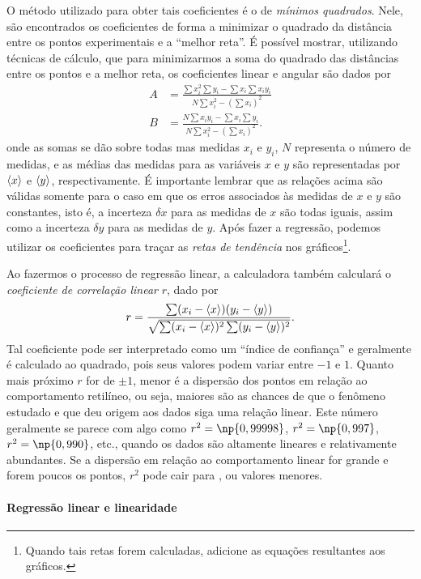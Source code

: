 O método utilizado para obter tais coeficientes é o de \emph{mínimos quadrados}. Nele, são encontrados os coeficientes de forma a minimizar o quadrado da distância entre os pontos experimentais e a ``melhor reta''. É possível mostrar\cite{Taylor}, utilizando técnicas de cálculo, que para minimizarmos a soma do quadrado das distâncias entre os pontos e a melhor reta, os coeficientes linear e angular são dados por
\begin{align}
	A &= \frac{\sum x_i^2 \sum y_i - \sum x_i \sum x_iy_i}{N \sum x_i^2 - (\sum x_i)^2} \\
	B &= \frac{N\sum x_iy_i - \sum x_i \sum y_i}{N \sum x_i^2 - (\sum x_i)^2}.
\end{align}
%
onde as somas se dão sobre todas mas medidas $x_i$ e $y_i$, $N$ representa o número de medidas, e as médias das medidas para as variáveis $x$ e $y$ são representadas por $\left\langle{x}\right\rangle$ e $\left\langle{y}\right\rangle$, respectivamente. É importante lembrar que as relações acima são válidas somente para o caso em que os erros associados às medidas de $x$ e $y$ são constantes, isto é, a incerteza $\delta x$ para as medidas de $x$ são todas iguais, assim como a incerteza $\delta y$ para as medidas de $y$. Após fazer a regressão, podemos utilizar os coeficientes para traçar as \emph{retas de tendência} nos gráficos\footnote{Quando tais retas forem calculadas, adicione as equações resultantes aos gráficos.}.

Ao fazermos o processo de regressão linear, a calculadora também calculará o \emph{coeficiente de correlação linear} $r$, dado por
\begin{equation}
	r = \frac{\sum (x_i - \left\langle{x}\right\rangle)(y_i-\left\langle{y}\right\rangle)}{\sqrt{\sum(x_i - \left\langle{x}\right\rangle)^2\sum (y_i - \left\langle{y}\right\rangle)^2}}.
\end{equation}
%
Tal coeficiente pode ser interpretado como um ``índice de confiança'' e geralmente é calculado ao quadrado, pois seus valores podem variar entre $-1$ e $1$. Quanto mais próximo $r$ for de $\pm 1$, menor é a dispersão dos pontos em relação ao comportamento retilíneo, ou seja, maiores são as chances de que o fenômeno estudado e que deu origem aos dados siga uma relação linear. Este número geralmente se parece com algo como $r^2=\np{0,99998}$, $r^2=\np{0,997}$, $r^2= \np{0,990}$, etc., quando os dados são altamente lineares e relativamente abundantes. Se a dispersão em relação ao comportamento linear for grande e forem poucos os pontos, $r^2$ pode cair para , ou valores menores.

\paragraph{Regressão linear e linearidade}

